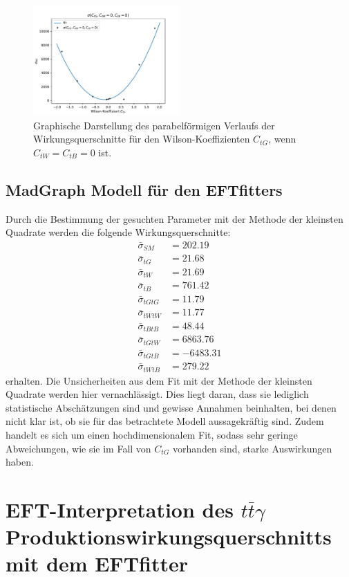 \begin{figure}
  \centering
  \includegraphics[width=0.5\textwidth]{Plots/combi_plot_tG.pdf}
  \caption{Graphische Darstellung des parabelförmigen Verlaufs der Wirkungsquerschnitte für den Wilson-Koeffizienten $C_{tG}$, wenn $C_{tW}=C_{tB}=0$ ist.}
  \label{fig:WtG}
\end{figure}

\section{MadGraph Modell für den EFTfitters}
Durch die Bestimmung der gesuchten Parameter mit der Methode der kleinsten Quadrate werden die folgende Wirkungsquerschnitte:
\begin{align*}
  \bar{\sigma}_{SM}   &= 202.19\\
  \bar{\sigma}_{tG} &= 21.68\\
  \bar{\sigma}_{tW} &= 21.69\\
  \bar{\sigma}_{tB} &= 761.42\\
  \bar{\sigma}_{tGtG} &= 11.79\\
  \bar{\sigma}_{tWtW} &= 11.77\\
  \bar{\sigma}_{tBtB} &= 48.44 \\
  \bar{\sigma}_{tGtW} &= 6863.76\\
  \bar{\sigma}_{tGtB} &= -6483.31\\
  \bar{\sigma}_{tWtB} &= 279.22
\end{align*}
erhalten. Die Unsicherheiten aus dem Fit mit der Methode der kleinsten Quadrate werden hier vernachlässigt. Dies liegt daran, dass sie lediglich statistische Abschätzungen sind und gewisse Annahmen beinhalten, bei denen nicht klar ist, ob sie für das betrachtete Modell aussagekräftig sind. Zudem handelt es sich um einen hochdimensionalem Fit, sodass sehr geringe Abweichungen, wie sie im Fall von $C_{tG}$ vorhanden sind, starke Auswirkungen haben.
%
%
\chapter{EFT-Interpretation des \texorpdfstring {$t\bar{t}\gamma$}{math} Produktionswirkungsquerschnitts mit dem EFTfitter}

